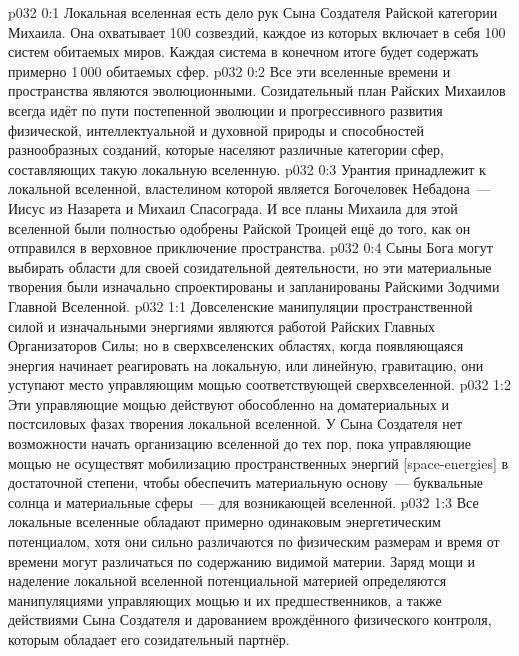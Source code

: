 \author{Могущественный Посланник}
\vs p032 0:1 Локальная вселенная есть дело рук Сына Создателя Райской категории Михаила. Она охватывает 100 созвездий, каждое из которых включает в себя 100 систем обитаемых миров. Каждая система в конечном итоге будет содержать примерно 1\,000 обитаемых сфер.
\vs p032 0:2 Все эти вселенные времени и пространства являются эволюционными. Созидательный план Райских Михаилов всегда идёт по пути постепенной эволюции и прогрессивного развития физической, интеллектуальной и духовной природы и способностей разнообразных созданий, которые населяют различные категории сфер, составляющих такую локальную вселенную.
\vs p032 0:3 Урантия принадлежит к локальной вселенной, властелином которой является Богочеловек Небадона~--- Иисус из Назарета и Михаил Спасограда. И все планы Михаила для этой вселенной были полностью одобрены Райской Троицей ещё до того, как он отправился в верховное приключение пространства.
\vs p032 0:4 Сыны Бога могут выбирать области для своей созидательной деятельности, но эти материальные творения были изначально спроектированы и запланированы Райскими Зодчими Главной Вселенной.
\vs p032 1:1 Довселенские манипуляции пространственной силой и изначальными энергиями являются работой Райских Главных Организаторов Силы; но в сверхвселенских областях, когда появляющаяся энергия начинает реагировать на локальную, или линейную, гравитацию, они уступают место управляющим мощью соответствующей сверхвселенной.
\vs p032 1:2 Эти управляющие мощью действуют обособленно на доматериальных и постсиловых фазах творения локальной вселенной. У Сына Создателя нет возможности начать организацию вселенной до тех пор, пока управляющие мощью не осуществят мобилизацию пространственных энергий [space\hyp{}energies] в достаточной степени, чтобы обеспечить материальную основу~--- буквальные солнца и материальные сферы~--- для возникающей вселенной.
\vs p032 1:3 \pc Все локальные вселенные обладают примерно одинаковым энергетическим потенциалом, хотя они сильно различаются по физическим размерам и время от времени могут различаться по содержанию видимой материи. Заряд мощи и наделение локальной вселенной потенциальной материей определяются манипуляциями управляющих мощью и их предшественников, а также действиями Сына Создателя и дарованием врождённого физического контроля, которым обладает его созидательный партнёр.
